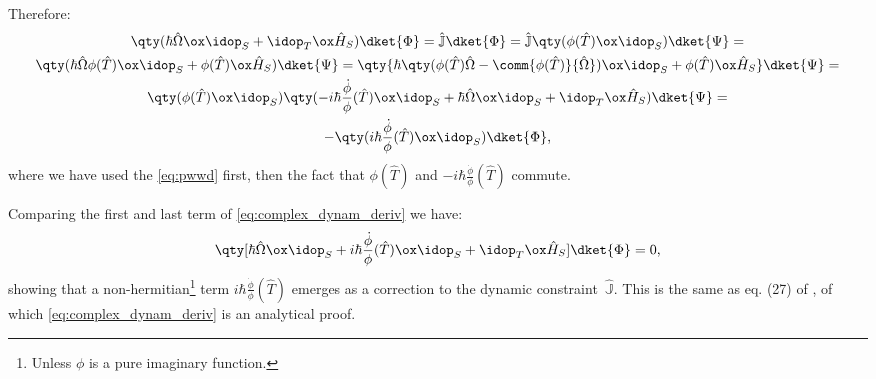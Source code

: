 Therefore:
\begin{multline}\label{eq:complex_dynam_deriv}
  \qty( \hbar\hat{\Omega} \ox \idop_S + \idop_T \ox \hat{H}_S ) \dket{\Phi} =
  \hat{\mathbb{J}}\dket{\Phi} =
  \hat{\mathbb{J}} \qty( \phi(\hat{T}) \ox \idop_S) \dket{\Psi} =
  \\
  \qty( \hbar\hat{\Omega}\phi(\hat{T}) \ox \idop_S + \phi(\hat{T}) \ox \hat{H}_S )\dket{\Psi} =
  \qty{
    \hbar\qty( \phi(\hat{T})\hat{\Omega} - \comm{\phi(\hat{T})}{\hat{\Omega}} ) \ox \idop_S +
    \phi(\hat{T}) \ox \hat{H}_S
  }\dket{\Psi} =
  \\
  \qty(
    \phi(\hat{T}) \ox \idop_S
  )
  \qty(
    - i \hbar \frac{\dot{\phi}}{\phi} (\hat{T}) \ox \idop_S
    + \hbar\hat{\Omega} \ox \idop_S
    + \idop_T \ox \hat{H}_S
  ) \dket{\Psi} =
  \\
  - \qty( i \hbar \frac{\dot{\phi}}{\phi} (\hat{T}) \ox \idop_S ) \dket{\Phi}
  \text{,}
\end{multline}
where we have used the \eqref{eq:pwwd} first, then the fact that $\phi(\hat{T})$
and $-i\hbar\frac{\dot{\phi}}{\phi}(\hat{T})$ commute.

Comparing the first and last term of \eqref{eq:complex_dynam_deriv} we have:
\begin{equation}\label{eq:nonu_pwwdw}
  \qty[
    \hbar\hat{\Omega} \ox \idop_S +
    i \hbar \frac{\dot{\phi}}{\phi}(\hat{T}) \ox \idop_S +
    \idop_T \ox \hat{H}_S
   ] \dket{\Phi} = 0
  \text{,}
\end{equation}
showing that a non-hermitian\footnote{
  Unless $\phi$  is a pure imaginary function.
}
term
$i \hbar \frac{\dot{\phi}}{\phi} (\hat{T})$
emerges as a correction to the dynamic constraint~$\hat{\mathbb{J}}$.
This is the same as eq. (27) of \cite{Lloyd:Time}, of which
\eqref{eq:complex_dynam_deriv} is an analytical proof.

